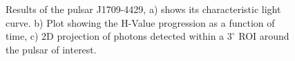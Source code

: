 \documentclass{PoS}
\begin{document}
\begin{figure}
{}
{}
\caption{Results of the pulsar J1709-4429, a)  shows its characteristic  light curve. b) Plot showing the H-Value progression as a function of time, c) 2D projection of photons detected within a $ 3^{\circ}$ ROI around the pulsar of interest.}\label{j1709}
\end{figure}
\end{document}
